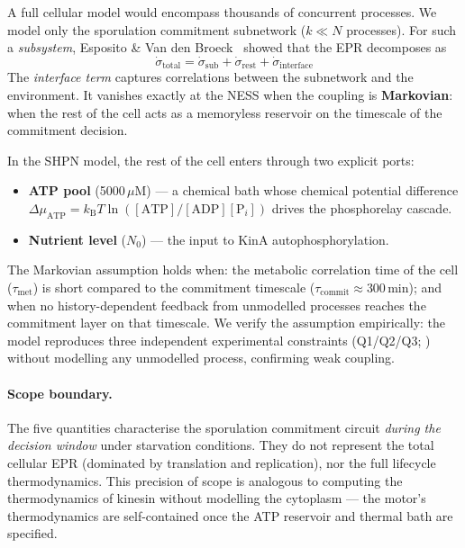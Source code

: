 \documentclass[11pt,a4paper]{article}
\newcommand{\kB}{k_{\mathrm{B}}}
\newcommand{\EPR}{\dot{\sigma}}
\begin{document}
A full cellular model would encompass thousands of concurrent processes.
We model only the sporulation commitment subnetwork ($k \ll N$ processes).
For such a \emph{subsystem}, Esposito \& Van den Broeck~\cite{Esposito2010}
showed that the EPR decomposes as
\begin{equation}
  \EPR_{\mathrm{total}} = \EPR_{\mathrm{sub}}
                        + \EPR_{\mathrm{rest}}
                        + \EPR_{\mathrm{interface}}
  \label{eq:epr_decomp}
\end{equation}
The \emph{interface term} captures correlations between the subnetwork
and the environment.
It vanishes exactly at the NESS when the coupling is \textbf{Markovian}:
when the rest of the cell acts as a memoryless reservoir on the timescale
of the commitment decision.

In the SHPN model, the rest of the cell enters through two explicit ports:
\begin{itemize}
  \item \textbf{ATP pool} (5000\,$\mu$M) --- a chemical bath whose
    chemical potential difference $\Delta\mu_{\mathrm{ATP}}
    = \kB T \ln([\mathrm{ATP}]/[\mathrm{ADP}][\mathrm{P}_i])$
    drives the phosphorelay cascade.
  \item \textbf{Nutrient level} ($N_0$) --- the input to KinA
    autophosphorylation.
\end{itemize}
The Markovian assumption holds when:
the metabolic correlation time of the cell ($\tau_{\mathrm{met}}$) is
short compared to the commitment timescale ($\tau_{\mathrm{commit}}
\approx 300$\,min);
and when no history-dependent feedback from unmodelled processes
reaches the commitment layer on that timescale.
We verify the assumption empirically: the model reproduces three
independent experimental constraints (Q1/Q2/Q3; )
without modelling any unmodelled process, confirming weak coupling.

\paragraph{Scope boundary.}
The five quantities characterise the sporulation commitment circuit
\emph{during the decision window} under starvation conditions.
They do not represent the total cellular EPR (dominated by translation
and replication), nor the full lifecycle thermodynamics.
This precision of scope is analogous to computing the thermodynamics of
kinesin without modelling the cytoplasm --- the motor's thermodynamics are
self-contained once the ATP reservoir and thermal bath are specified.
\end{document}
